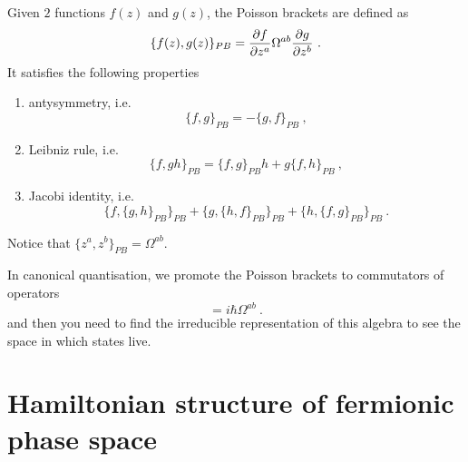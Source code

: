    Given $2$ functions $f(z)$ and $g(z)$, the Poisson brackets are defined as 
    \begin{equation*}
        \{f(z), g(z)\}_{PB} = \frac{\partial f}{\partial z^a} \Omega^{ab} \frac{\partial g}{\partial z^b} ~.
    \end{equation*}
    It satisfies the following properties 
    \begin{enumerate}
        \item antysymmetry, i.e.
            \begin{equation*}
                \{f, g\}_{PB} = - \{g, f\}_{PB} ~,
            \end{equation*}
        \item Leibniz rule, i.e. 
            \begin{equation*}
                \{f, g h\}_{PB} = \{f, g\}_{PB} h + g \{f, h\}_{PB}~,
            \end{equation*}
        \item Jacobi identity, i.e. 
            \begin{equation*}
                \{f, \{g, h\}_{PB} \}_{PB} + \{g, \{h, f\}_{PB} \}_{PB} + \{h, \{f, g\}_{PB} \}_{PB} ~.
            \end{equation*}
    \end{enumerate}
    Notice that $\{z^a, z^b\}_{PB} = \Omega^{ab}$.

    In canonical quantisation, we promote the Poisson brackets to commutators of operators
    \begin{equation*}
        [\hat z^a, \hat z^b] = i \hbar \Omega^{ab} ~.
    \end{equation*}
    and then you need to find the irreducible representation of this algebra to see the space in which states live.

\section{Hamiltonian structure of fermionic phase space}

